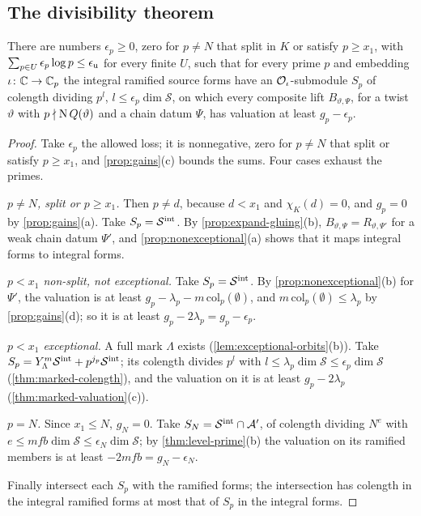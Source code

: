 \subsection{The divisibility theorem}\label{ss:divisibility-theorem}

\begin{theorem}\label{thm:divisibility}
There are numbers $\epsilon_p\ge0$, zero for $p\ne N$ that split in $K$ or satisfy $p\ge x_1$, with $\sum_{p\in U}\epsilon_p\log p\le\epsilon_{\mathrm{u}}$ for every
finite $U$, such that for every prime $p$ and embedding $\iota\colon\mathbb{C}\to\mathbb{C}_p$ the integral ramified source forms have an $\mathcal{O}_\iota$-submodule $S_p$ of
colength dividing $p^l$, $l\le\epsilon_p\dim\mathcal S$, on which every composite lift $B_{\vartheta,\Psi}$, for a twist $\vartheta$ with $p\nmid\operatorname{N} Q(\vartheta)$
and a chain datum $\Psi$, has valuation at least $g_p-\epsilon_p$.
\end{theorem}

\begin{proof}
Take $\epsilon_p$ the allowed loss; it is nonnegative, zero for $p\ne N$ that split or satisfy $p\ge x_1$, and \cref{prop:gains}(c) bounds the sums. Four cases exhaust the primes.

\emph{$p\ne N$, split or $p\ge x_1$.} Then $p\ne d$, because $d<x_1$ and $\chi_K(d)=0$, and $g_p=0$ by \cref{prop:gains}(a). Take $S_p=\mathcal S^{\rm int}$. By \cref{prop:expand-gluing}(b), $B_{\vartheta,\Psi}=R_{\vartheta,\Psi'}$ for a weak chain datum $\Psi'$, and \cref{prop:nonexceptional}(a) shows that it maps integral forms to integral forms.

\emph{$p<x_1$ non-split, not exceptional.} Take $S_p=\mathcal S^{\rm int}$. By \cref{prop:nonexceptional}(b) for $\Psi'$, the valuation is at least $g_p-\lambda_p-m\,\mathrm{col}_p(\emptyset)$, and $m\,\mathrm{col}_p(\emptyset)\le\lambda_p$ by \cref{prop:gains}(d); so it is at least $g_p-2\lambda_p=g_p-\epsilon_p$.

\emph{$p<x_1$ exceptional.} A full mark $\Lambda$ exists (\cref{lem:exceptional-orbits}(b)). Take $S_p=Y_\Lambda^m\mathcal S^{\rm int}+p^{j_p}\mathcal S^{\rm int}$; its colength divides $p^l$ with $l\le\lambda_p\dim\mathcal S\le\epsilon_p\dim\mathcal S$ (\cref{thm:marked-colength}), and the valuation on it is at least $g_p-2\lambda_p$
(\cref{thm:marked-valuation}(c)).

\emph{$p=N$.} Since $x_1\le N$, $g_N=0$. Take $S_N=\mathcal S^{\rm int}\cap\mathcal A'$, of colength dividing $N^e$ with $e\le mfb\dim\mathcal S\le\epsilon_N\dim\mathcal S$; by \cref{thm:level-prime}(b) the valuation on its ramified members is at least $-2mfb=g_N-\epsilon_N$.

Finally intersect each $S_p$ with the ramified forms; the intersection has colength in the integral ramified forms at most that of $S_p$ in the integral forms.
\end{proof}
